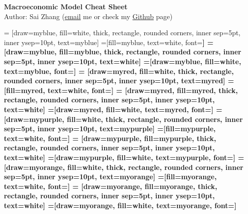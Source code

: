 \documentclass[10pt,landscape,a4paper]{article}
\begin{document}
\begin{center}{\large{\textbf{Macroeconomic Model Cheat Sheet}}}\\
Author: Sai Zhang (\href{mailto:saizhang.econ@gmail.com}{email} me or check my \href{https://github.com/SaiChrisZHANG}{Github} page)
\end{center}

\scriptsize
\begin{multicols*}{3}

 = [draw=myblue, fill=white, thick, rectangle, rounded corners, inner sep=5pt, inner ysep=10pt, text=myblue]
 =[fill=myblue, text=white, font=\bfseries]
 = [draw=myblue, fill=myblue, thick, rectangle, rounded corners, inner sep=5pt, inner ysep=10pt, text=white]
 =[draw=myblue, fill=white, text=myblue, font=\bfseries]
 = [draw=myred, fill=white, thick, rectangle, rounded corners, inner sep=5pt, inner ysep=10pt, text=myred]
 =[fill=myred, text=white, font=\bfseries]
 = [draw=myred, fill=myred, thick, rectangle, rounded corners, inner sep=5pt, inner ysep=10pt, text=white]
 =[draw=myred, fill=white, text=myred, font=\bfseries]
 = [draw=mypurple, fill=white, thick, rectangle, rounded corners, inner sep=5pt, inner ysep=10pt, text=mypurple]
 =[fill=mypurple, text=white, font=\bfseries]
 = [draw=mypurple, fill=mypurple, thick, rectangle, rounded corners, inner sep=5pt, inner ysep=10pt, text=white]
 =[draw=mypurple, fill=white, text=mypurple, font=\bfseries]
 = [draw=myorange, fill=white, thick, rectangle, rounded corners, inner sep=5pt, inner ysep=10pt, text=myorange]
 =[fill=myorange, text=white, font=\bfseries]
 = [draw=myorange, fill=myorange, thick, rectangle, rounded corners, inner sep=5pt, inner ysep=10pt, text=white]
 =[draw=myorange, fill=white, text=myorange, font=\bfseries]


\end{multicols*}
\end{document}
